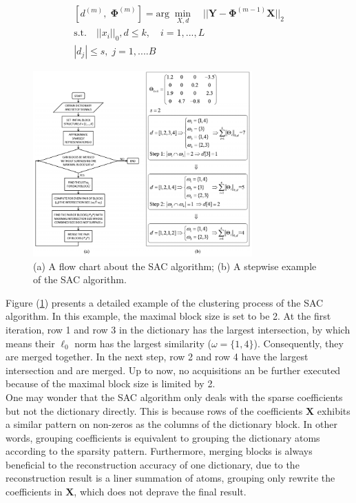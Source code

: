 \begin{equation}
\begin{aligned}
    \left[d^{(m)}, \;\mathbf{\Phi}^{(m)}\right] = \text{arg} \; \min_{X,d} \quad || \mathbf{Y} - \mathbf{\Phi}^{(m-1)}\mathbf{X}||_2 \\
    \text{s.t.} \quad ||x_i||_0,d \leq k, \quad i = 1,...,L\\
    |d_j| \leq s, \; j = 1,....B
\end{aligned}
\end{equation}

\begin{figure}[!htbp]
\centering
\includegraphics[width=0.75\textwidth]{images/flow_chart.png}
\caption{(a) A flow chart about the SAC algorithm; (b) A stepwise example of the SAC algorithm.}
\label{flow_sac}
\end{figure}

Figure (\ref{flow_sac}) presents a detailed example of the clustering process of the SAC algorithm. In this example, the maximal block size is set to be 2. At the first iteration, row 1 and row 3 in the dictionary has the largest intersection, by which means their $\ell_0$ norm has the largest similarity ($\omega = \{1,4\}$). Consequently, they are merged together. In the next step, row 2 and row 4 have the largest intersection and are merged. Up to now, no acquisitions an be further executed because of the maximal block size is limited by 2. \\

One may wonder that the SAC algorithm only deals with the sparse coefficients but not the dictionary directly. This is because rows of the coefficients $\mathbf{X}$ exhibits a similar pattern on non-zeros as the columns of the dictionary block. In other words, grouping coefficients is equivalent to grouping the dictionary atoms according to the sparsity pattern. Furthermore, merging blocks is always beneficial to the reconstruction accuracy of one dictionary, due to the reconstruction result is a liner summation of atoms, grouping only rewrite the coefficients in $\mathbf{X}$, which does not deprave the final result.\\


